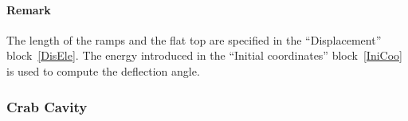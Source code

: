 \documentclass[a4paper,11pt]{report}
\begin{document}
\paragraph{Remark}
The length of the ramps and the flat top are specified in the
``Displacement'' block~\ref{DisEle}. The energy introduced in the
``Initial coordinates'' block~\ref{IniCoo} is used to compute the 
deflection angle.





\subsubsection{Crab Cavity} \label{CrabCav}
\end{document}
